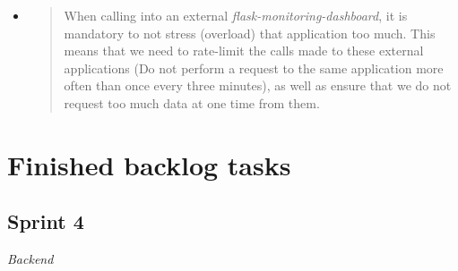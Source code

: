 \begin{itemize}
  \begin{itemize}
  \item
    \begin{quote}
    When calling into an external \emph{flask-monitoring-dashboard}, it
    is mandatory to not stress (overload) that application too much.
    This means that we need to rate-limit the calls made to these
    external applications (Do not perform a request to the same
    application more often than once every three minutes), as well as
    ensure that we do not request too much data at one time from them.
    \end{quote}
  \end{itemize}
\end{itemize}


\hypertarget{finished-backlog-tasks}{%
\section{Finished backlog tasks}\label{finished-backlog-tasks}}

\hypertarget{sprint-4}{%
\subsection{Sprint 4}\label{sprint-4}}

\emph{Backend}

